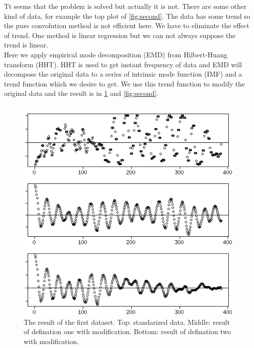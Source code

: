\documentclass[12pt]{article}
\begin{document}
Tt seems that the problem is solved but actually it is not. There are some other kind of data, for example the top plot of \ref{fig:second}. The data has some trend so the pure convolution method is not efficient here. We have to eliminate the effect of trend. One method is linear regression but we can not always suppose the trend is linear. \\

Here we apply empirical mode decomposition (EMD) from Hilbert-Huang transform (HHT). HHT is used to get instant frequency of data and EMD will decompose the original data to a series of intrinsic mode function (IMF) and a trend function which we desire to get. We use this trend function to modify the original data and the result is in \ref{fig:first} and \ref{fig:second}. \\ 

\begin{figure}[h]
\caption{The result of the first dataset. Top: standarized data. Middle: result of defination one with modification. Bottom: result of defination two with modification.}
\label{fig:first}
\centering
\includegraphics{012}
\end{figure}
\end{document}
